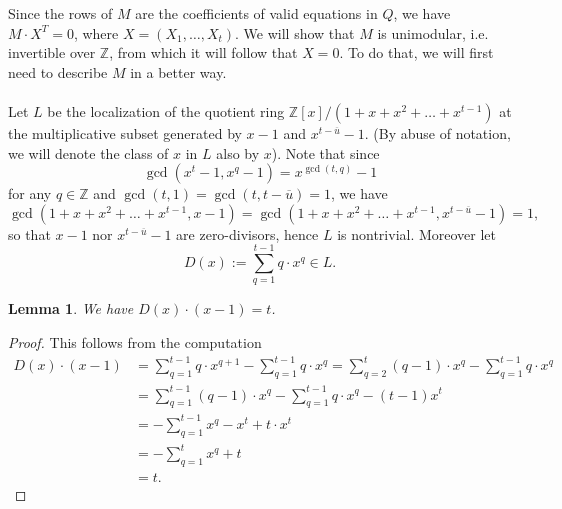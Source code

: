 \documentclass[12pt,a4paper]{article}
\newtheorem{lemma}[theorem]{Lemma}
\newcommand{\Z}{\mathbb{Z}}
\newcommand{\uo}{\overline{u}}
\begin{document}
Since the rows of $M$ are the coefficients of valid equations in $Q$, we have $M\cdot X^T=0$, where $X=(X_1,\dots,X_t)$. We will show that $M$ is unimodular, i.e. invertible over $\Z$, from which it will follow that $X=0$. To do that, we will first need to describe $M$ in a better way.

\paragraph*{}
Let $L$ be the localization of the quotient ring $\Z[x]/(1+x+x^2+\dots+x^{t-1})$ at the multiplicative subset generated by $x-1$ and $x^{t-\uo}-1$. (By abuse of notation, we will denote the class of $x$ in $L$ also by $x$). Note that since $$\gcd(x^t-1,x^q-1)=x^{\gcd(t,q)}-1$$ for any $q\in\Z$ and $\gcd(t,1)=\gcd(t,t-\uo)=1$, we have $$\gcd(1+x+x^2+\dots+x^{t-1},x-1)=\gcd(1+x+x^2+\dots+x^{t-1},x^{t-\uo}-1)=1,$$ so that $x-1$ nor $x^{t-\uo}-1$ are zero-divisors, hence $L$ is nontrivial. Moreover let $$D(x):=\sum_{q=1}^{t-1}q\cdot x^q\in L.$$

\begin{lemma}
We have $D(x)\cdot(x-1)=t$.
\end{lemma}
\begin{proof}
This follows from the computation
\begin{equation*}
\begin{split}
D(x)\cdot(x-1)&=\sum_{q=1}^{t-1} q\cdot x^{q+1}-\sum_{q=1}^{t-1} q\cdot x^q=\sum_{q=2}^{t} (q-1)\cdot x^{q}-\sum_{q=1}^{t-1} q\cdot x^q\\
&=\sum_{q=1}^{t-1} (q-1)\cdot x^{q}-\sum_{q=1}^{t-1} q\cdot x^q-(t-1)x^t\\
&=-\sum_{q=1}^{t-1} x^{q}-x^t+t\cdot x^t\\
&=-\sum_{q=1}^{t} x^{q}+t\\
&=t.
\end{split}
\end{equation*}
\end{proof}
\end{document}
